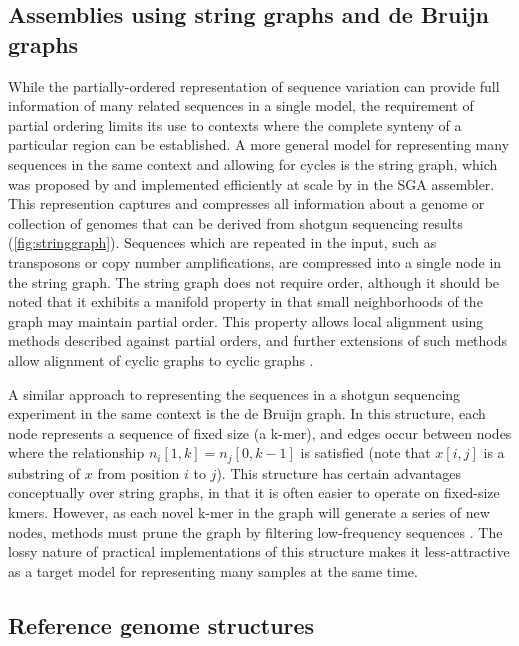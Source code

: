 \documentclass{article}
\begin{document}
\subsection{Assemblies using string graphs and de Bruijn graphs}

While the partially-ordered representation of sequence variation can provide full information of many related sequences in a single model, the requirement of partial ordering limits its use to contexts where the complete synteny of a particular region can be established. A more general model for representing many sequences in the same context and allowing for cycles is the string graph, which was proposed by \cite{myers2005} and implemented efficiently at scale by \cite{simpson2010} in the SGA assembler. This represention captures and compresses all information about a genome or collection of genomes that can be derived from shotgun sequencing results (\ref{fig:stringgraph}). Sequences which are repeated in the input, such as transposons or copy number amplifications, are compressed into a single node in the string graph. The string graph does not require order, although it should be noted that it exhibits a manifold property in that small neighborhoods of the graph may maintain partial order. This property allows local alignment using methods described against partial orders, and further extensions of such methods allow alignment of cyclic graphs to cyclic graphs \cite{myers1989}.

A similar approach to representing the sequences in a shotgun sequencing experiment in the same context is the de Bruijn graph. In this structure, each node represents a sequence of fixed size (a k-mer), and edges occur between nodes where the relationship $n_i[1, k] = n_j[0, k-1]$ is satisfied (note that $x[i, j]$ is a substring of $x$ from position $i$ to $j$). This structure has certain advantages conceptually over string graphs, in that it is often easier to operate on fixed-size kmers. However, as each novel k-mer in the graph will generate a series of new nodes, methods must prune the graph by filtering low-frequency sequences \cite{iqbal2012}. The lossy nature of practical implementations of this structure makes it less-attractive as a target model for representing many samples at the same time.

\subsection{Reference genome structures}
\end{document}
